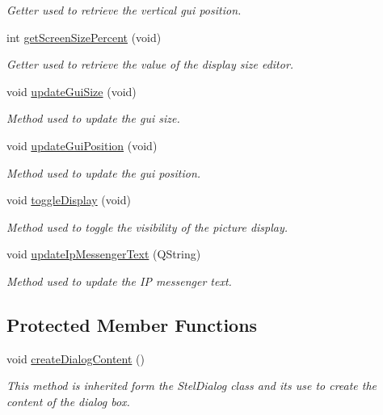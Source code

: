 \begin{DoxyCompactItemize}
\begin{DoxyCompactList}\small\item\em Getter used to retrieve the vertical gui position. \end{DoxyCompactList}\item 
int \hyperlink{class_autoscope_window_form_a51b6c47d99b53207d9e65157f01270ff}{get\+Screen\+Size\+Percent} (void)
\begin{DoxyCompactList}\small\item\em Getter used to retrieve the value of the display size editor. \end{DoxyCompactList}\item 
void \hyperlink{class_autoscope_window_form_af62e38bc2170d8504f63f07e5d0b4943}{update\+Gui\+Size} (void)
\begin{DoxyCompactList}\small\item\em Method used to update the gui size. \end{DoxyCompactList}\item 
void \hyperlink{class_autoscope_window_form_aada2c3ef979ce1718bb981490f6c7495}{update\+Gui\+Position} (void)
\begin{DoxyCompactList}\small\item\em Method used to update the gui position. \end{DoxyCompactList}\item 
void \hyperlink{class_autoscope_window_form_adfa249163e1c2a72485c24a575a67efb}{toggle\+Display} (void)
\begin{DoxyCompactList}\small\item\em Method used to toggle the visibility of the picture display. \end{DoxyCompactList}\item 
void \hyperlink{class_autoscope_window_form_a38a4a73945cffab764db46b8deec800a}{update\+Ip\+Messenger\+Text} (Q\+String)
\begin{DoxyCompactList}\small\item\em Method used to update the IP messenger text. \end{DoxyCompactList}\end{DoxyCompactItemize}
\subsection*{Protected Member Functions}
\begin{DoxyCompactItemize}
\item 
void \hyperlink{class_autoscope_window_form_ab48246f0892a43963b7d209dc3bf4b4f}{create\+Dialog\+Content} ()
\begin{DoxyCompactList}\small\item\em This method is inherited form the Stel\+Dialog class and it\textquotesingle{}s use to create the content of the dialog box. \end{DoxyCompactList}\end{DoxyCompactItemize}
